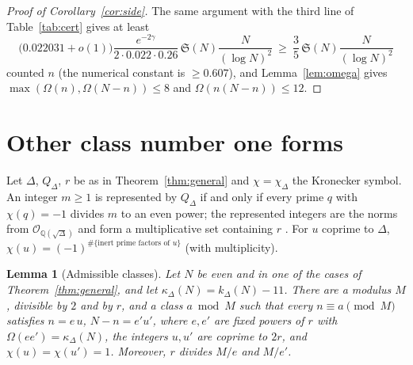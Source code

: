 \documentclass[11pt]{amsart}
\newtheorem{lemma}[theorem]{Lemma}
\theoremstyle{remark}
\newcommand{\Sg}{\mathfrak{S}}
\begin{document}
\begin{proof}[Proof of Corollary~\ref{cor:side}]
The same argument with the third line of Table~\ref{tab:cert} gives at least
\[
\bigl(0.022031+o(1)\bigr)\frac{e^{-2\gamma}}{2\cdot0.022\cdot0.26}\,\Sg(N)\frac{N}{(\log N)^2}
\ \ge\ \frac35\,\Sg(N)\frac{N}{(\log N)^2}
\]
counted $n$ (the numerical constant is $\ge0.607$), and Lemma~\ref{lem:omega} gives $\max(\Omega(n),\Omega(N-n))\le8$ and $\Omega(n(N-n))\le12$.
\end{proof}

\section{Other class number one forms}\label{sec:general}

Let $\Delta$, $Q_\Delta$, $r$ be as in Theorem~\ref{thm:general} and $\chi=\chi_\Delta$ the Kronecker symbol.
An integer $m\ge1$ is represented by $Q_\Delta$ if and only if every prime $q$ with $\chi(q)=-1$ divides $m$
to an even power; the represented integers are the norms from $\mathcal O_{\mathbb Q(\sqrt\Delta)}$ and form a
multiplicative set containing $r$ \cite[Lemma~6.1]{Chen1}. For $u$ coprime to $\Delta$,
$\chi(u)=(-1)^{\#\{\text{inert prime factors of }u\}}$ (with multiplicity).

\begin{lemma}[Admissible classes]\label{lem:admissible}
Let $N$ be even and in one of the cases of Theorem~\ref{thm:general}, and let $\kappa_\Delta(N)=k_\Delta(N)-11$.
There are a modulus $M$, divisible by $2$ and by $r$, and a class $a\bmod M$ such that every $n\equiv a\pmod M$
satisfies $n=e\,u$, $N-n=e'u'$, where $e,e'$ are fixed powers of $r$ with $\Omega(ee')=\kappa_\Delta(N)$, the
integers $u,u'$ are coprime to $2r$, and $\chi(u)=\chi(u')=1$. Moreover, $r$ divides $M/e$ and $M/e'$.
\end{lemma}
\end{document}
